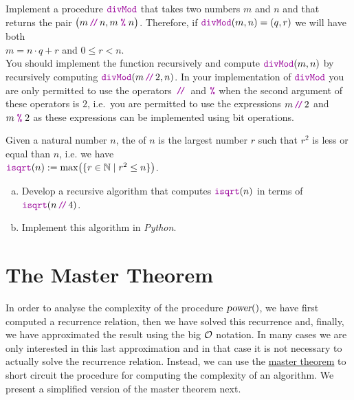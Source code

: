 \exercise
Implement a procedure $\mytt{divMod}$ that takes two numbers $m$ and $n$ and that returns the pair
$\bigl(m \dv n, m \;\mytt{\%}\; n\bigr)$.
Therefore, if $\mytt{divMod}(m, n) = (q,r)$ we will have both
\\[0.2cm]
\hspace*{1.3cm}
$m = n \cdot q + r$ \quad and \quad $0 \leq r < n$.
\\[0.2cm]
You should implement the function recursively and compute 
$\mytt{divMod}(m, n)$ by recursively computing $\mytt{divMod}(m \dv 2, n)$.
In your implementation of $\mytt{divMod}$ you are only permitted to use the operators $\dv$ and
$\mytt{\%}$ when the second argument of these operators is $2$, i.e.~you are permitted to
use the expressions $m \dv 2$ and $m \;\mytt{\%}\; 2$ as these expressions can be implemented
using bit operations.
\eoxs


\exercise
Given a natural number $n$, the   of $n$ is the largest
number $r$ such that $r^2$ is less or equal than $n$, i.e. we have
\\[0.2cm]
\hspace*{1.3cm}
$\mytt{isqrt}(n) := \max\bigl(\{ r \in \mathbb{N} \mid r^2 \leq n \}\bigr)$.
\begin{enumerate}[(a)]
\item Develop a recursive algorithm that computes $\mytt{isqrt}(n)$ in terms of $\mytt{isqrt}(n\dv4)$.
\item Implement this algorithm in \textsl{Python}. \eoxs
\end{enumerate}

\section{The Master Theorem}
In order to analyse the complexity of  the procedure $\textsl{power}()$,
we have first computed a  recurrence relation, then we have solved this recurrence and, finally,  
we have approximated the result using the big $\mathcal{O}$ notation.  In many cases we are only interested in this
last approximation and in that case it is not necessary to actually solve the recurrence relation.  
Instead, we can use the 
\href{http://en.wikipedia.org/wiki/Master_theorem#Generic_form}{master theorem} to short 
circuit the procedure for computing the complexity of an algorithm. 
We present a simplified version of the master theorem next.

